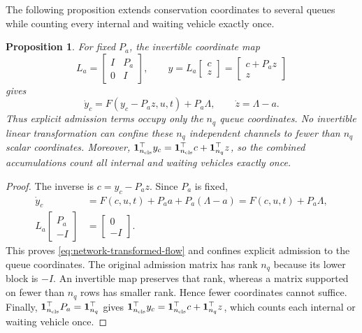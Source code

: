 \documentclass[preprint,12pt]{elsarticle}
\theoremstyle{definition}
\theoremstyle{plain}
\newtheorem{proposition}{Proposition}
\theoremstyle{definition}
\theoremstyle{plain}
\begin{document}
The following proposition extends conservation coordinates to several
queues while counting every internal and waiting vehicle exactly once.

\begin{proposition}
\label{prop:network-localization}
For fixed $P_a$, the invertible coordinate map
\begin{equation}
 L_a=\begin{bmatrix}I&P_a\\0&I\end{bmatrix},\qquad
 y=L_a\begin{bmatrix}c\\z\end{bmatrix}
   =\begin{bmatrix}c+P_a z\\z\end{bmatrix}
 \label{eq:network-transform}
\end{equation}
gives
\begin{equation}
 \dot y_c=F(y_c-P_a z,u,t)+P_a\Lambda,\qquad
 \dot z=\Lambda-a.
 \label{eq:network-transformed-flow}
\end{equation}
Thus explicit admission terms occupy only the $n_q$ queue coordinates. No
invertible linear transformation can confine these $n_q$ independent channels
to fewer than $n_q$ scalar coordinates. Moreover,
$\mathbf1_{n_{\rm cls}}^\top y_c=\mathbf1_{n_{\rm cls}}^\top c+\mathbf1_{n_q}^\top z$, so the combined
accumulations count all internal and waiting vehicles exactly once.
\end{proposition}

\begin{proof}
The inverse is $c=y_c-P_a z$. Since $P_a$ is fixed,
\[
 \begin{aligned}
 \dot y_c&=F(c,u,t)+P_a a+P_a(\Lambda-a)=F(c,u,t)+P_a\Lambda,\\
 L_a\begin{bmatrix}P_a\\-I\end{bmatrix}
 &=\begin{bmatrix}0\\-I\end{bmatrix}.
 \end{aligned}
\]
This proves \eqref{eq:network-transformed-flow} and confines explicit
admission to the queue coordinates. The original admission matrix has
rank $n_q$ because its lower block is $-I$. An invertible map preserves
that rank, whereas a matrix supported on fewer than $n_q$ rows has
smaller rank. Hence fewer coordinates cannot suffice. Finally,
$\mathbf1_{n_{\rm cls}}^\top P_a=\mathbf1_{n_q}^\top$ gives
$\mathbf1_{n_{\rm cls}}^\top y_c=\mathbf1_{n_{\rm cls}}^\top c+\mathbf1_{n_q}^\top z$,
which counts each internal or waiting vehicle once.
\end{proof}
\end{document}
